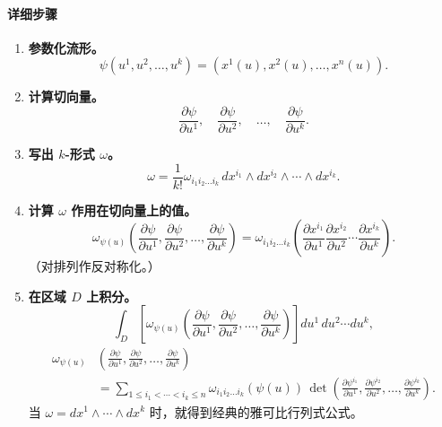 \paragraph{详细步骤}
\begin{enumerate}
\item \textbf{参数化流形。}
\[
  \psi(u^1,u^2,\dots,u^k)=(x^1(u),x^2(u),\dots,x^n(u)).
\]
\item \textbf{计算切向量。}
\[
  \frac{\partial\psi}{\partial u^1},\quad\frac{\partial\psi}{\partial u^2},
   \quad\dots,\quad\frac{\partial\psi}{\partial u^k}.
\]
\item \textbf{写出 $k$-形式 $\omega$。}
\[
  \omega=\frac{1}{k!}\omega_{i_1i_2\dots i_k}\,
  dx^{i_1}\wedge dx^{i_2}\wedge\cdots\wedge dx^{i_k}.
\]
\item \textbf{计算 $\omega$ 作用在切向量上的值。}
\[
  \omega_{\psi(u)}
  \left(\frac{\partial\psi}{\partial u^1},\frac{\partial\psi}{\partial u^2},
  \dots,\frac{\partial\psi}{\partial u^k}\right)
  =\omega_{i_1i_2\dots i_k}
  \left(\frac{\partial x^{i_1}}{\partial u^1}
       \frac{\partial x^{i_2}}{\partial u^2}\cdots
       \frac{\partial x^{i_k}}{\partial u^k}\right).
\]
（对排列作反对称化。）
\item \textbf{在区域 $D$ 上积分。}%
%
\[
  \int_D\left[\omega_{\psi(u)}
  \left(\frac{\partial\psi}{\partial u^1},\frac{\partial\psi}{\partial u^2},
  \dots,\frac{\partial\psi}{\partial u^k}\right)\right]du^1\,du^2\cdots du^k,
\]
\begin{align*}
  \omega_{\psi(u)}&\left(\frac{\partial\psi}{\partial u^1},
   \frac{\partial\psi}{\partial u^2},\dots,\frac{\partial\psi}{\partial u^k}\right)\\
  &=\sum_{1\le i_1<\cdots<i_k\le n}\omega_{i_1i_2\dots i_k}(\psi(u))\,
    \det\left(\frac{\partial\psi^{i_1}}{\partial u^1},
              \frac{\partial\psi^{i_2}}{\partial u^2},\dots,
              \frac{\partial\psi^{i_k}}{\partial u^k}\right).
\end{align*}
当 $\omega=dx^1\wedge\cdots\wedge dx^k$ 时，就得到经典的雅可比行列式公式。
\end{enumerate}

